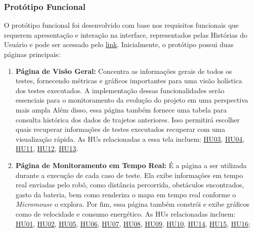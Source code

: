\subsubsection{Protótipo Funcional}
O protótipo funcional foi desenvolvido com base nos requisitos funcionais que requerem apresentação e interação na interface, representados pelas Histórias do Usuário e pode ser acessado pelo \href{https://www.figma.com/proto/2ZyxT13T50XnVaUs51JKeb/XAROPi---Prot%C3%B3tipo-Funcional?page-id=0%3A1&node-id=46-1543&viewport=-1443%2C185%2C0.37&t=nvLNuJQbUXyazppG-1&scaling=min-zoom&content-scaling=fixed&starting-point-node-id=46%3A1543}{link}. Inicialmente, o protótipo possui duas páginas principais:
\begin{enumerate}
    \item \textbf{Página de Visão Geral:} Concentra as informações gerais de todos os testes, fornecendo métricas e gráficos importantes para uma visão holística dos testes executados. A implementação dessas funcionalidades serão essenciais para o monitoramento da evolução do projeto em uma perspectiva mais ampla Além disso, essa página também fornece uma tabela para consulta histórica dos dados de trajetos anteriores. Isso permitirá escolher quais recuperar informações de testes executados recuperar com uma visualização rápida. As HUs relacionadas a essa tela incluem: 
\href{https://github.com/fcte-pi1/2026.1_PI1_Grupo01_Bruno/issues/232}{HU03},  
\href{https://github.com/fcte-pi1/2026.1_PI1_Grupo01_Bruno/issues/233}{HU04}, 
\href{https://github.com/fcte-pi1/2026.1_PI1_Grupo01_Bruno/issues/248}{HU11}, 
\href{https://github.com/fcte-pi1/2026.1_PI1_Grupo01_Bruno/issues/249}{HU12}, 
\href{https://github.com/fcte-pi1/2026.1_PI1_Grupo01_Bruno/issues/250}{HU13}.
    \item \textbf{Página de Monitoramento em Tempo Real:} É a página a ser utilizada durante a execução de cada caso de teste. Ela exibe informações em tempo real enviadas pelo robô, como distância percorrida, obstáculos encontrados, gasto da bateria, bem como renderiza o mapa em tempo real conforme o \textit{Micromouse} o explora. Por fim, essa página também constrói e exibe gráficos como de velocidade e consumo energético. As HUs relacionadas incluem: 
\href{https://github.com/fcte-pi1/2026.1_PI1_Grupo01_Bruno/issues/230}{HU01}, 
\href{https://github.com/fcte-pi1/2026.1_PI1_Grupo01_Bruno/issues/231}{HU02}, 
\href{https://github.com/fcte-pi1/2026.1_PI1_Grupo01_Bruno/issues/234}{HU05},  
\href{https://github.com/fcte-pi1/2026.1_PI1_Grupo01_Bruno/issues/235}{HU06},  
\href{https://github.com/fcte-pi1/2026.1_PI1_Grupo01_Bruno/issues/236}{HU07}, 
\href{https://github.com/fcte-pi1/2026.1_PI1_Grupo01_Bruno/issues/237}{HU08}, 
\href{https://github.com/fcte-pi1/2026.1_PI1_Grupo01_Bruno/issues/246}{HU09},  
\href{https://github.com/fcte-pi1/2026.1_PI1_Grupo01_Bruno/issues/247}{HU10},  
\href{https://github.com/fcte-pi1/2026.1_PI1_Grupo01_Bruno/issues/251}{HU14},  
\href{https://github.com/fcte-pi1/2026.1_PI1_Grupo01_Bruno/issues/252}{HU15},  
\href{https://github.com/fcte-pi1/2026.1_PI1_Grupo01_Bruno/issues/253}{HU16};  
\end{enumerate}

